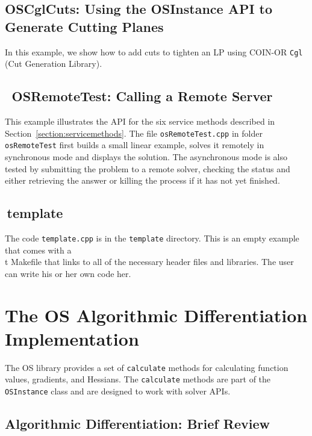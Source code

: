 \documentclass[11pt]{article}
\renewcommand{\_}{{\char"5F}}
\renewcommand{\{}{{\char"7B}}
\renewcommand{\}}{{\char"7D}}
\renewcommand{\^}{{\char"0D}}
\renewcommand{\'}{{\char"0D}}
\begin{document}
\begin{enumerate}[Step 1:]
\subsection{OSCglCuts: Using the OSInstance API to Generate Cutting Planes}\label{section:exampleOSAddCuts}

In this example, we show how to add cuts to tighten an LP using COIN-OR  {\tt Cgl} (Cut Generation Library).

\subsection{ \, OSRemoteTest:  Calling a Remote Server}\label{section:exampleOSRemoteTest}

This example illustrates the API for the six service methods described in Section~\ref{section:servicemethods}.
The file {\tt osRemoteTest.cpp} in folder {\tt osRemoteTest} first builds a small linear
example, solves it remotely in synchronous mode and displays the solution.
The asynchronous mode is also tested by submitting the problem to a remote solver,
checking the status and either retrieving the answer or killing the process if it has not
yet finished.

\subsection{ \,template}\label{section:exampleTemplate} The code {\tt template.cpp} is in the {\tt template} directory.  This is an empty example  that comes with a {\\t Makefile}  that links to all of the necessary header files and libraries.  The user can write his or her own code her. 

\section{The OS Algorithmic Differentiation Implementation}\label{section:ad}

The OS library provides a set of {\tt calculate} methods for calculating  function values, gradients, and Hessians.
The {\tt calculate} methods are part of the {\tt OSInstance} class and are designed to work with solver APIs.



\subsection{Algorithmic Differentiation:  Brief Review}\label{section:adtheory}


\end{enumerate}
\end{document}
